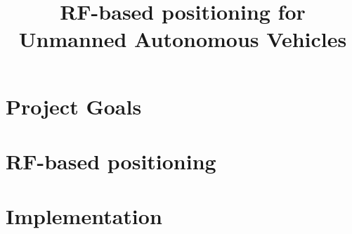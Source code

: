 \documentclass[12pt,oneside,a4paper,english]{article}
\title{RF-based positioning for Unmanned Autonomous Vehicles} %
\begin{document}


\newpage
\doublespacing
\renewcommand{\baselinestretch}{1}\normalsize
\tableofcontents
\renewcommand{\baselinestretch}{1}\normalsize
\thispagestyle{fancy} %

\newpage
{}

\section{Project Goals} \label{ch1}


\newpage

\section{RF-based positioning} \label{ch2}


\section{Implementation} \label{ch3}


\label{EndOfText}

\newpage
{}



\label{endOfDoc}
\end{document}
